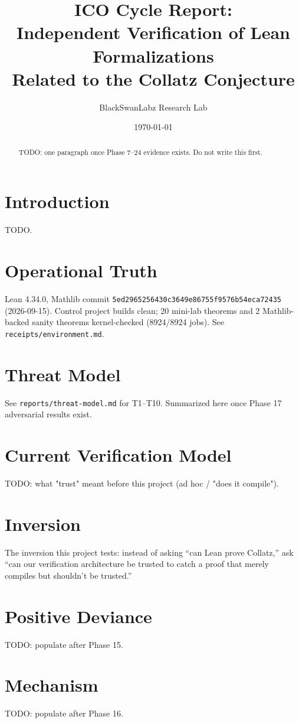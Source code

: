 \documentclass[11pt]{article}
\title{ICO Cycle Report:\\Independent Verification of Lean Formalizations\\Related to the Collatz Conjecture}
\author{BlackSwanLabz Research Lab}
\date{\today}
\begin{document}
\maketitle

\begin{abstract}
TODO: one paragraph once Phase 7--24 evidence exists. Do not write this first.
\end{abstract}

\section{Introduction}
TODO.

\section{Operational Truth}
Lean 4.34.0, Mathlib commit \texttt{5ed2965256430c3649e86755f9576b54eca72435}
(2026-09-15). Control project builds clean; 20 mini-lab theorems and 2
Mathlib-backed sanity theorems kernel-checked (8924/8924 jobs). See
\texttt{receipts/environment.md}.

\section{Threat Model}
See \texttt{reports/threat-model.md} for T1--T10. Summarized here once
Phase 17 adversarial results exist.

\section{Current Verification Model}
TODO: what "trust" meant before this project (ad hoc / "does it compile").

\section{Inversion}
The inversion this project tests: instead of asking ``can Lean prove Collatz,''
ask ``can our verification architecture be trusted to catch a proof that merely
compiles but shouldn't be trusted.''

\section{Positive Deviance}
TODO: populate after Phase 15.

\section{Mechanism}
TODO: populate after Phase 16.
\end{document}
